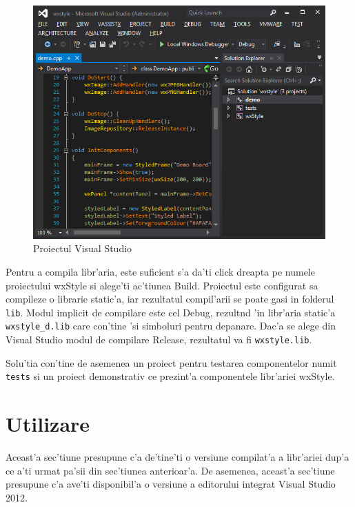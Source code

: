 \begin{figure}[H]
\includegraphics[width=15cm]{img/ch7_project.png}
\caption{Proiectul Visual Studio}
\label{fig:figure6.1}
\end{figure}

Pentru a compila libr'aria, este suficient s'a da'ti click dreapta pe numele proiectului wxStyle si alege'ti ac'tiunea Build. Proiectul este configurat sa compileze o librarie static'a, iar rezultatul compil'arii se poate gasi in folderul \texttt{lib}. Modul implicit de compilare este cel Debug, rezult{\ia}nd 'in libr'aria static'a \texttt{wxstyle\_d.lib} care con'tine 'si simboluri pentru depanare. Dac'a se alege din Visual Studio modul de compilare Release, rezultatul va fi \texttt{wxstyle.lib}.

Solu'tia con'tine de asemenea un proiect pentru testarea componentelor numit \texttt{tests} si un proiect demonstrativ ce prezint'a componentele libr'ariei wxStyle.


\section{Utilizare}

Aceast'a sec'tiune presupune c'a de'tine'ti o versiune compilat'a a libr'ariei dup'a ce a'ti urmat pa'sii din sec'tiunea anterioar'a. De asemenea, aceast'a sec'tiune presupune c'a ave'ti disponibil'a o versiune a editorului integrat Visual Studio 2012.

